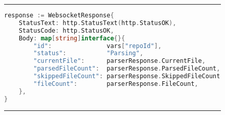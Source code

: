 \begin{figure}[H]
\noindent\rule{\textwidth}{1pt}
\begin{lstlisting}[language=Go, caption={Websocket success response}, label={lst:websocketMessageSuccess}]
response := WebsocketResponse{
	StatusText: http.StatusText(http.StatusOK),
	StatusCode: http.StatusOK,
	Body: map[string]interface{}{
		"id":               vars["repoId"],
		"status":           "Parsing",
		"currentFile":      parserResponse.CurrentFile,
		"parsedFileCount":  parserResponse.ParsedFileCount,
		"skippedFileCount": parserResponse.SkippedFileCount,
		"fileCount":        parserResponse.FileCount,
	},
}
\end{lstlisting}
\noindent\rule{\textwidth}{1pt}
\end{figure}